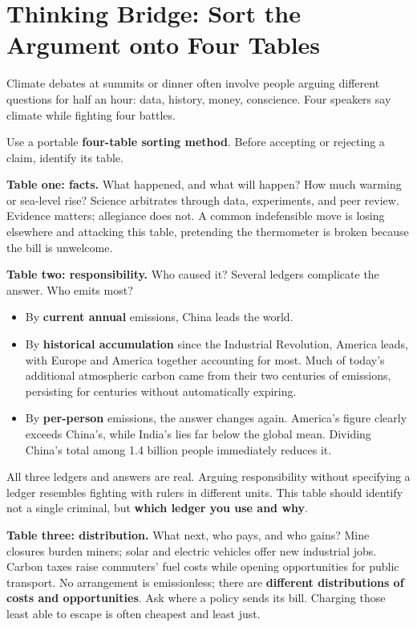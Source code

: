 \section[Sort the Argument onto Four Tables]{Thinking Bridge: Sort the Argument onto Four Tables}
Climate debates at summits or dinner often involve people arguing different questions for half an hour: data, history, money, conscience. Four speakers say climate while fighting four battles.

Use a portable \textbf{four-table sorting method}. Before accepting or rejecting a claim, identify its table.

\textbf{Table one: facts.} What happened, and what will happen? How much warming or sea-level rise? Science arbitrates through data, experiments, and peer review. Evidence matters; allegiance does not. A common indefensible move is losing elsewhere and attacking this table, pretending the thermometer is broken because the bill is unwelcome.

\textbf{Table two: responsibility.} Who caused it? Several ledgers complicate the answer. Who emits most?

\begin{itemize}
\item By \textbf{current annual} emissions, China leads the world.
\item By \textbf{historical accumulation} since the Industrial Revolution, America leads, with Europe and America together accounting for most. Much of today's additional atmospheric carbon came from their two centuries of emissions, persisting for centuries without automatically expiring.
\item By \textbf{per-person} emissions, the answer changes again. America's figure clearly exceeds China's, while India's lies far below the global mean. Dividing China's total among 1.4 billion people immediately reduces it.
\end{itemize}
All three ledgers and answers are real. Arguing responsibility without specifying a ledger resembles fighting with rulers in different units. This table should identify not a single criminal, but \textbf{which ledger you use and why}.

\textbf{Table three: distribution.} What next, who pays, and who gains? Mine closures burden miners; solar and electric vehicles offer new industrial jobs. Carbon taxes raise commuters' fuel costs while opening opportunities for public transport. No arrangement is emissionless; there are \textbf{different distributions of costs and opportunities}. Ask where a policy sends its bill. Charging those least able to escape is often cheapest and least just.

